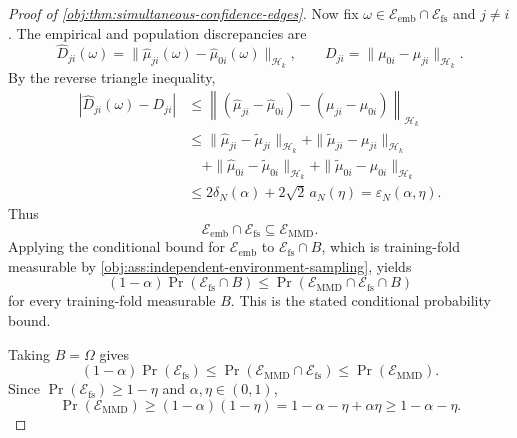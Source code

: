 \begin{proof}[Proof of \cref{obj:thm:simultaneous-confidence-edges}]
Now fix \(\omega\in\mathcal E_{\mathrm{emb}}\cap\mathcal E_{\mathrm{fs}}\) and \(j\ne i\).  The empirical and population discrepancies are
\[
\widehat D_{ji}(\omega)
=
\|\widehat\mu_{j i}(\omega)-\widehat\mu_{0 i}(\omega)\|_{\mathcal H_k},
\qquad
D_{ji}
=
\|\mu_{0 i}-\mu_{j i}\|_{\mathcal H_k}.
\]
By the reverse triangle inequality,
\[
\begin{aligned}
|\widehat D_{ji}(\omega)-D_{ji}|
&\le
\left\|
(\widehat\mu_{j i}-\widehat\mu_{0 i})
-
(\mu_{j i}-\mu_{0 i})
\right\|_{\mathcal H_k}                                                    \\
&\le
\|\widehat\mu_{j i}-\widetilde\mu_{j i}\|_{\mathcal H_k}
+
\|\widetilde\mu_{j i}-\mu_{j i}\|_{\mathcal H_k}                            \\
&\quad+
\|\widehat\mu_{0 i}-\widetilde\mu_{0 i}\|_{\mathcal H_k}
+
\|\widetilde\mu_{0 i}-\mu_{0 i}\|_{\mathcal H_k}                            \\
&\le
2\delta_N(\alpha)+2\sqrt2\,a_N(\eta)
=
\varepsilon_N(\alpha,\eta).
\end{aligned}
\]
Thus
\[
\mathcal E_{\mathrm{emb}}\cap\mathcal E_{\mathrm{fs}}
\subseteq
\mathcal E_{\mathrm{MMD}}.
\]
Applying the conditional bound for \(\mathcal E_{\mathrm{emb}}\) to \(\mathcal E_{\mathrm{fs}}\cap B\), which is training-fold measurable by \cref{obj:ass:independent-environment-sampling}, yields
\[
(1-\alpha)\Pr(\mathcal E_{\mathrm{fs}}\cap B)
\le
\Pr(\mathcal E_{\mathrm{MMD}}\cap\mathcal E_{\mathrm{fs}}\cap B)
\]
for every training-fold measurable \(B\).  This is the stated conditional probability bound.

Taking \(B=\Omega\) gives
\[
(1-\alpha)\Pr(\mathcal E_{\mathrm{fs}})
\le
\Pr(\mathcal E_{\mathrm{MMD}}\cap\mathcal E_{\mathrm{fs}})
\le
\Pr(\mathcal E_{\mathrm{MMD}}).
\]
Since \(\Pr(\mathcal E_{\mathrm{fs}})\ge 1-\eta\) and
\(\alpha,\eta\in(0,1)\),
\[
\Pr(\mathcal E_{\mathrm{MMD}})
\ge
(1-\alpha)(1-\eta)
=
1-\alpha-\eta+\alpha\eta
\ge
1-\alpha-\eta.
\]


\end{proof}
